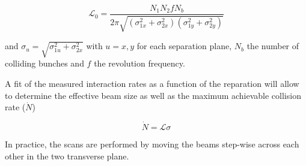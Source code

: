 \begin{equation}
\mathcal{L}_{0} = \frac{N_{1}N_{2}fN_{b}}{2\pi\sqrt{(\sigma_{1x}^{2}+\sigma_{2x}^{2})(\sigma_{1y}^{2}+\sigma_{2y}^{2})}}
\end{equation}

and $\sigma_{u} = \sqrt{\sigma_{1u}^{2}+\sigma_{2x}^{2}}$ with $u=x,y$ for each separation plane, $N_{b}$ the number of colliding bunches and $f$ the revolution frequency.

A fit of the measured interaction rates as a function of the reparation will allow to determine the effective beam size as well as the maximum achievable collision rate ($\dot{N}$)

\begin{equation}
\dot{N} = \mathcal{L}\sigma
\end{equation}

In practice, the scans are performed by moving the beams step-wise across each other in the two transverse plane.





